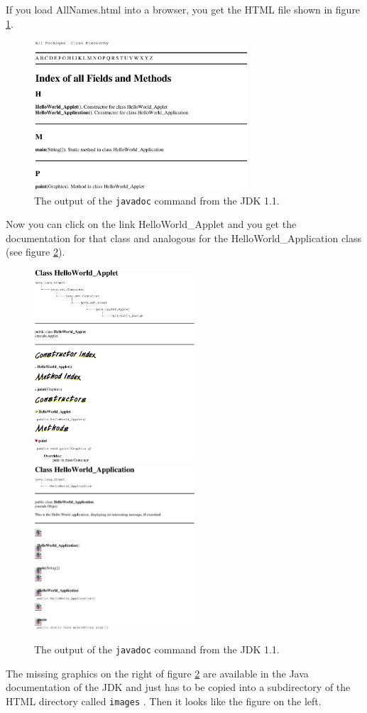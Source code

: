 If you load AllNames.html into a browser, you get the HTML file shown
in figure \ref{fig:javadoc1}.
\begin{figure}[htbp]
  \begin{center}
    \leavevmode
 \includegraphics[width=8cm]{../Figures/AllNames.eps} 
    \caption{The output of the \texttt{javadoc} command from the JDK 1.1.}
    \label{fig:javadoc1}
  \end{center}
\end{figure}
Now you can click on the link HelloWorld\_Applet and you get the
documentation for that class and analogous for the HelloWorld\_Application
class (see figure \ref{fig:javadoc2}).
\begin{figure}[htbp]
  \begin{center}
    \leavevmode
  \includegraphics[width=6cm]{../Figures/HelloWorld_Applet.eps}
  \includegraphics[width=6cm]{../Figures/HelloWorld_Application.eps}
    \caption{The output of the \texttt{javadoc} command from the JDK 1.1.}
    \label{fig:javadoc2}
  \end{center}
\end{figure}
The missing graphics on the right of figure \ref{fig:javadoc2} 
are available in the Java documentation of the
JDK and just has to be copied into a subdirectory  
of the HTML directory called \verb|images| . 
Then it looks like the figure on the left.

